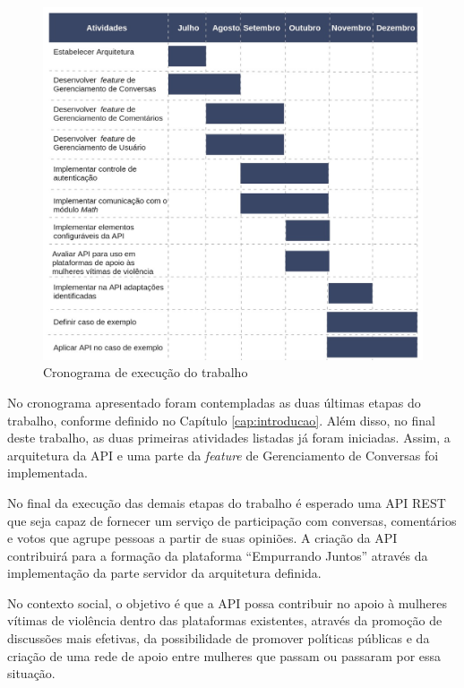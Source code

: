 \begin{figure}[ht!]
\centering
\includegraphics[scale=0.45]{figuras/cronograma.jpg}
\caption{Cronograma de execução do trabalho}
\label{fig:planejamento}
\end{figure}

No cronograma apresentado foram contempladas as duas últimas etapas do trabalho, conforme definido no Capítulo \ref{cap:introducao}. Além disso,
no final deste trabalho, as duas primeiras atividades listadas já foram iniciadas. Assim, a arquitetura da API e uma parte da \textit{feature}
de Gerenciamento de Conversas foi implementada.

No final da execução das demais etapas do trabalho é esperado uma API REST que seja capaz de fornecer um serviço de participação com conversas, comentários
e votos que agrupe pessoas a partir de suas opiniões. A criação da API contribuirá para a formação da plataforma ``Empurrando Juntos'' 
através da implementação da parte servidor da arquitetura definida.

No contexto social, o objetivo é que a API possa contribuir no apoio à mulheres vítimas de violência dentro das plataformas existentes, através
da promoção de discussões mais efetivas, da possibilidade de promover políticas públicas e da criação de uma rede de apoio entre mulheres que passam ou passaram por essa situação.
